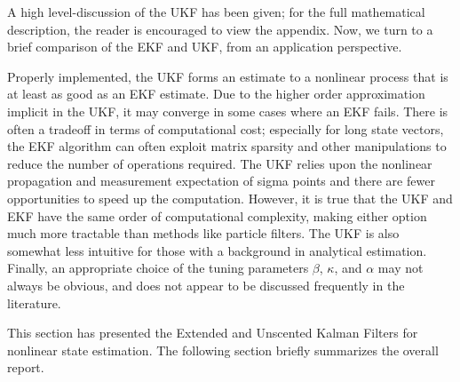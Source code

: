 A high level-discussion of the UKF has been given; for the full mathematical description, the reader is encouraged to view the appendix.
Now, we turn to a brief comparison of the EKF and UKF, from an application perspective.

Properly implemented, the UKF forms an estimate to a nonlinear process that is at least as good as an EKF estimate.
Due to the higher order approximation implicit in the UKF, it may converge in some cases where an EKF fails.
There is often a tradeoff in terms of computational cost; especially for long state vectors, the EKF algorithm can often exploit matrix sparsity and other manipulations to reduce the number of operations required.
The UKF relies upon the nonlinear propagation and measurement expectation of sigma points and there are fewer opportunities to speed up the computation. 
However, it is true that the UKF and EKF have the same order of computational complexity\cite{wan2000}, making either option much more tractable than methods like particle filters.
The UKF is also somewhat less intuitive for those with a background in analytical estimation.
Finally, an appropriate choice of the tuning parameters $\beta$, $\kappa$, and $\alpha$ may not always be obvious, and does not appear to be discussed frequently in the literature.

This section has presented the Extended and Unscented Kalman Filters for nonlinear state estimation.
The following section briefly summarizes the overall report.